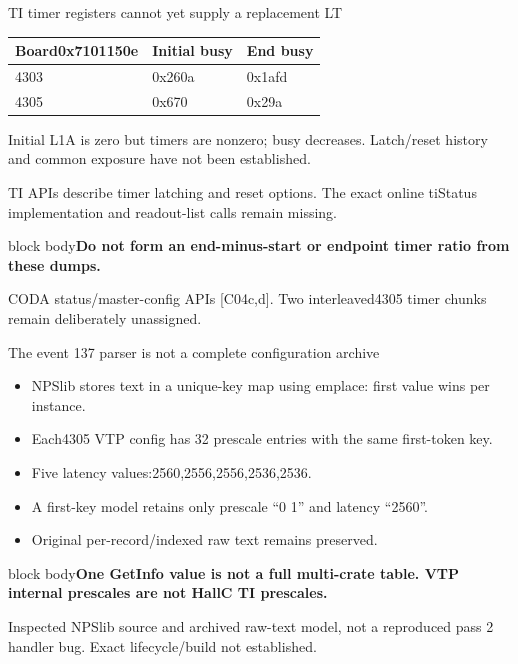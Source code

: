\documentclass[aspectratio=169,11pt]{beamer}
\newcommand{\source}[1]{\par\vfill{\scriptsize\color{muted}#1\par}}
\newcommand{\takeaway}[1]{\begin{beamercolorbox}[sep=2.5mm,wd=\linewidth]{block body}\textbf{#1}\end{beamercolorbox}}
\begin{document}
\begin{frame}{TI timer registers cannot yet supply a replacement LT}
\small\begin{tabular}{@{}lll@{}}\toprule
Board0x7101150e & Initial busy & End busy\\\midrule
4303 & 0x260a & 0x1afd\\
4305 & 0x670 & 0x29a\\\bottomrule
\end{tabular}\vspace{4mm}
Initial L1A is zero but timers are nonzero; busy decreases. Latch/reset history
and common exposure have not been established.
\vspace{3mm}\par TI APIs describe timer latching and reset options. The exact online
tiStatus implementation and readout-list calls remain missing.
\vspace{4mm}\takeaway{Do not form an end-minus-start or endpoint timer ratio from these dumps.}
\source{CODA status/master-config APIs [C04c,d]. Two interleaved4305 timer chunks remain deliberately unassigned.}
\end{frame}

\begin{frame}{The event 137 parser is not a complete configuration archive}
\small\begin{itemize}\setlength\itemsep{3mm}
\item NPSlib stores text in a unique-key map using emplace: first value wins per instance.
\item Each4305 VTP config has 32 prescale entries with the same first-token key.
\item Five latency values:2560,2556,2556,2536,2536.
\item A first-key model retains only prescale ``0 1'' and latency ``2560''.
\item Original per-record/indexed raw text remains preserved.
\end{itemize}\vspace{3mm}
\takeaway{One GetInfo value is not a full multi-crate table. VTP internal prescales are not HallC TI prescales.}
\source{Inspected NPSlib source and archived raw-text model, not a reproduced pass 2 handler bug. Exact lifecycle/build not established.}
\end{frame}
\end{document}
